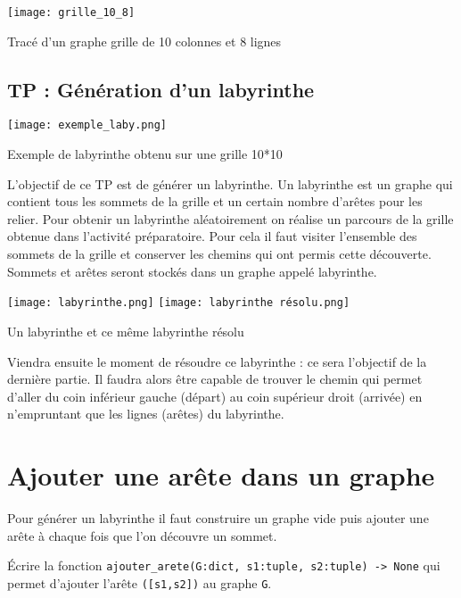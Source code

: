 \begin{marginfigure}\centering
\texttt{[image: grille\_10\_8]}
\caption{Tracé d'un graphe grille de 10 colonnes et 8 lignes}
\end{marginfigure}


\newpage
\subsection*{TP : Génération d'un labyrinthe}

\begin{marginfigure}
\texttt{[image: exemple\_laby.png]}
\caption{Exemple de labyrinthe obtenu sur une grille 10*10}
\end{marginfigure}


L'objectif de ce TP est de générer un labyrinthe. Un labyrinthe est un graphe qui contient tous les sommets de la grille et un certain nombre d'arêtes pour les relier.
Pour obtenir un labyrinthe aléatoirement on réalise un parcours de la grille obtenue dans l'activité préparatoire.
Pour cela il faut visiter l'ensemble des sommets de la grille et conserver les chemins qui ont permis cette découverte. Sommets et arêtes seront stockés dans un graphe appelé labyrinthe.


\begin{marginfigure}\centering
	\texttt{[image: labyrinthe.png]}
            \texttt{[image: labyrinthe résolu.png]}            
\caption{Un labyrinthe et ce même labyrinthe résolu}
\end{marginfigure}


Viendra ensuite le moment de résoudre ce labyrinthe : ce sera l'objectif de la dernière partie. Il faudra alors être capable de trouver le chemin qui permet d'aller du coin inférieur gauche (départ) au coin supérieur droit (arrivée) en n'empruntant que les lignes (arêtes) du labyrinthe. 

\section*{Ajouter une arête dans un graphe}
Pour générer un labyrinthe il faut construire un graphe vide puis ajouter une arête à chaque fois que l'on découvre un sommet.



\begin{question}
Écrire la fonction \lstinline{ajouter_arete(G:dict, s1:tuple, s2:tuple) -> None} qui permet d'ajouter l'arête \lstinline{([s1,s2])} au graphe \lstinline{G}. 
\end{question}


